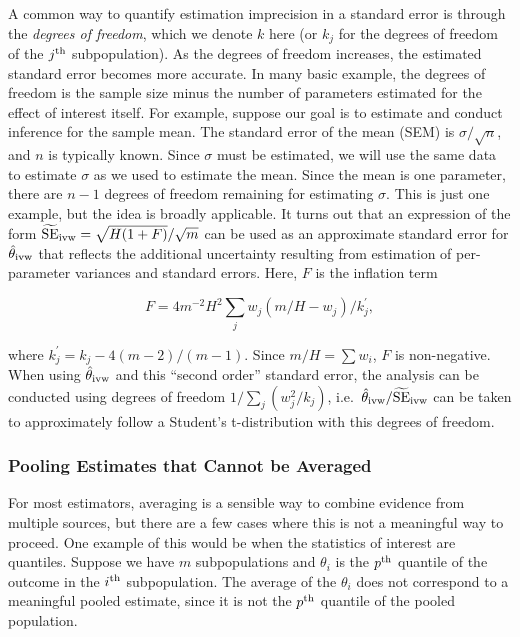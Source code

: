 A common way to quantify estimation imprecision in a standard error is through the {\em degrees of freedom}, which we denote $k$ here (or $k_j$ for the degrees of freedom of the $j^{\rm th}$ subpopulation). As the degrees of freedom increases, the estimated standard error becomes more accurate. In many basic example, the degrees of freedom is the sample size minus the number of parameters estimated for the effect of interest itself.  For example, suppose our goal is to estimate and conduct inference for the sample mean.  The standard error of the mean (SEM) is $\sigma/\sqrt{n}$, and $n$ is typically known.  Since $\sigma$ must be estimated, we will use the same data to estimate $\sigma$ as we used to estimate the mean.  Since the mean is one parameter, there are $n-1$ degrees of freedom remaining for estimating $\sigma$.  This is just one example, but the idea is broadly applicable. It turns out that an expression of the form $\widetilde{\rm SE}_{\rm ivw} = \sqrt{H(1+F)}/\sqrt{m}$ can be used as an approximate standard error for $\hat{\theta}_{\rm ivw}$ that reflects the additional uncertainty resulting from estimation of per-parameter variances and standard errors. Here, $F$ is the inflation term

$$
F = 4m^{-2}H^{2}\sum_j w_j(m/H - w_j)/k_j^\prime,
$$

\noindent where $k^\prime_j = k_j - 4(m-2)/(m-1)$. Since $m/H = \sum w_i$, $F$ is non-negative. When using $\hat{\theta}_{\rm ivw}$ and this ``second order'' standard error, the analysis can be conducted using degrees of freedom $1 / \sum_j (w_j^2/k_j)$, i.e.\ $\hat{\theta}_{\rm ivw} / \widetilde{\rm SE}_{\rm ivw}$ can be taken to approximately follow a Student's t-distribution with this degrees of freedom.

\subsubsection{Pooling Estimates that Cannot be Averaged}

For most estimators, averaging is a sensible way to combine evidence from multiple sources, but there are a few cases where this is not a meaningful way to proceed. One example of this would be when the statistics of interest are quantiles. Suppose we have $m$ subpopulations and $\theta_i$ is the $p^{\rm th}$ quantile of the outcome in the $i^{\rm th}$ subpopulation. The average of the $\theta_i$ does not correspond to a meaningful pooled estimate, since it is not the $p^{\rm th}$ quantile of the pooled population.

